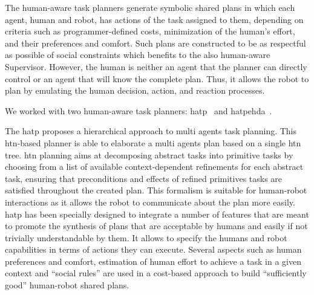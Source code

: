 \documentclass[a4paper,11pt,twoside]{StyleThese}
\begin{document}
The human-aware task planners generate symbolic shared plans in which each agent, human and robot, has actions of the task assigned to them, depending on criteria such as programmer-defined costs, minimization of the human's effort, and their preferences and comfort. Such plans are constructed to be as respectful as possible of social constraints which benefits to the also human-aware Supervisor. However, the human is neither an agent that the planner can directly control or an agent that will know the complete plan. Thus, it allows the robot to plan by emulating the human decision, action, and reaction processes. 

We worked with two human-aware task planners: \acrfull{hatp}~\cite{lallement_2014_hatp} and \acrfull{hatpehda}~\cite{buisan_2021_human}.

The \acrfull{hatp} proposes a hierarchical approach to multi agents task planning. This \acrfull{htn}-based planner is able to elaborate a multi agents plan based on a single \acrshort{htn} tree. \acrshort{htn} planning aims at decomposing abstract tasks into primitive tasks by choosing from a list of available context-dependent refinements for each abstract task, ensuring that preconditions and effects of refined primitives tasks are satisfied throughout the created plan. This formalism is suitable for human-robot interactions as it allows the robot to communicate about the plan more easily. \acrshort{hatp} has been specially designed to integrate a number of features that are meant to promote the synthesis of plans that are acceptable by humans and easily if not trivially understandable by them. It allows to specify the humans and robot capabilities in terms of actions they can execute. Several aspects such as human preferences and comfort, estimation of human effort to achieve a task in a given context and ``social rules'' are used in a cost-based approach to build ``sufficiently good'' human-robot shared plans.
\end{document}
